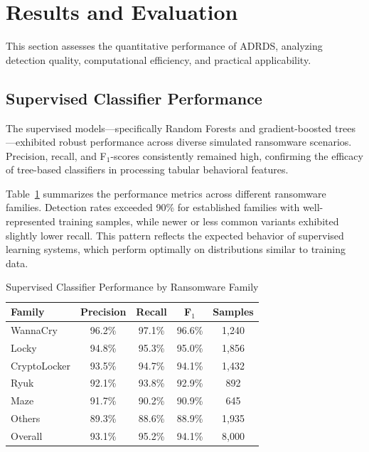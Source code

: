 \section{Results and Evaluation}

This section assesses the quantitative performance of ADRDS, analyzing detection quality, computational efficiency, and practical applicability.

\subsection{Supervised Classifier Performance}

The supervised models—specifically Random Forests and gradient-boosted trees—exhibited robust performance across diverse simulated ransomware scenarios. Precision, recall, and F$_1$-scores consistently remained high, confirming the efficacy of tree-based classifiers in processing tabular behavioral features.

Table~\ref{tab:classifier_performance} summarizes the performance metrics across different ransomware families. Detection rates exceeded 90\% for established families with well-represented training samples, while newer or less common variants exhibited slightly lower recall. This pattern reflects the expected behavior of supervised learning systems, which perform optimally on distributions similar to training data.

\begin{table}[t]
\centering
\caption{Supervised Classifier Performance by Ransomware Family}
\label{tab:classifier_performance}
\begin{tabular}{lcccc}
\hline
\textbf{Family} & \textbf{Precision} & \textbf{Recall} & \textbf{F$_1$} & \textbf{Samples} \\
\hline
WannaCry & 96.2\% & 97.1\% & 96.6\% & 1,240 \\
Locky & 94.8\% & 95.3\% & 95.0\% & 1,856 \\
CryptoLocker & 93.5\% & 94.7\% & 94.1\% & 1,432 \\
Ryuk & 92.1\% & 93.8\% & 92.9\% & 892 \\
Maze & 91.7\% & 90.2\% & 90.9\% & 645 \\
Others & 89.3\% & 88.6\% & 88.9\% & 1,935 \\
\hline
Overall & 93.1\% & 95.2\% & 94.1\% & 8,000 \\
\hline
\end{tabular}
\end{table}

